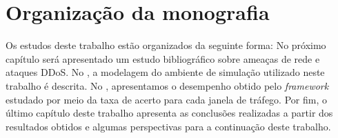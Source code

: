 \section{Organização da monografia}
Os estudos deste trabalho estão organizados da seguinte forma: No próximo capítulo será apresentado um estudo bibliográfico sobre ameaças de rede e ataques DDoS. No , a modelagem do ambiente de simulação utilizado neste trabalho é descrita. No , apresentamos o desempenho obtido pelo \textit{framework} estudado por meio da taxa de acerto para cada janela de tráfego. Por fim, o último capítulo deste trabalho apresenta as conclusões realizadas a partir dos resultados obtidos e algumas perspectivas para a continuação deste trabalho. 